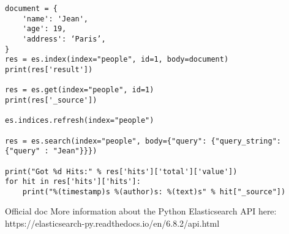 \documentclass{beamer}[10pt, usepdftitle=false handout]
\begin{document}
\begin{frame}[fragile]
\begingroup
\fontsize{6pt}{8pt}\selectfont
\begin{verbatim}
document = {
    'name': 'Jean',
    'age': 19,
    'address': ‘Paris’,
}
res = es.index(index="people", id=1, body=document)
print(res['result'])

res = es.get(index="people", id=1)
print(res['_source'])

es.indices.refresh(index="people")

res = es.search(index="people", body={"query": {"query_string": {"query" : "Jean"}}})

print("Got %d Hits:" % res['hits']['total']['value'])
for hit in res['hits']['hits']:
    print("%(timestamp)s %(author)s: %(text)s" % hit["_source"]) 
\end{verbatim}
\endgroup

\begin{block}{Official doc}
More information about the Python Elasticsearch API here:
https://elasticsearch-py.readthedocs.io/en/6.8.2/api.html
\end{block}
\end{frame}
\end{document}
